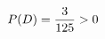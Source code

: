 \documentclass[preview]{standalone}
\begin{document}
\begin{align*}
\special{dvisvgm:raw <g id='unique000'>}P(D)=\frac3{125}>0\special{dvisvgm:raw </g>}
\end{align*}
\end{document}
